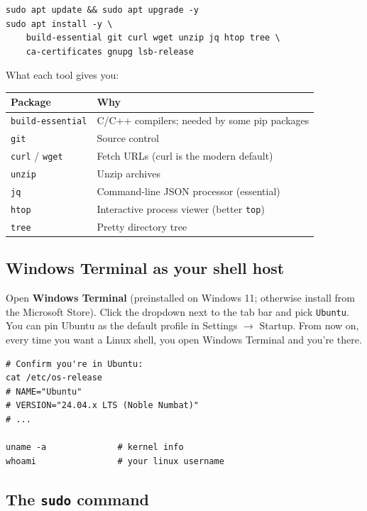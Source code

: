 \documentclass[11pt,a4paper]{article}
\begin{document}
\begin{lstlisting}[style=bashstyle]
sudo apt update && sudo apt upgrade -y
sudo apt install -y \
    build-essential git curl wget unzip jq htop tree \
    ca-certificates gnupg lsb-release
\end{lstlisting}

What each tool gives you:

\begin{center}
\begin{tabular}{ll}
\toprule
\textbf{Package} & \textbf{Why} \\
\midrule
\texttt{build-essential} & C/C++ compilers; needed by some pip packages \\
\texttt{git}            & Source control \\
\texttt{curl} / \texttt{wget} & Fetch URLs (curl is the modern default) \\
\texttt{unzip}          & Unzip archives \\
\texttt{jq}             & Command-line JSON processor (essential) \\
\texttt{htop}           & Interactive process viewer (better \texttt{top}) \\
\texttt{tree}           & Pretty directory tree \\
\bottomrule
\end{tabular}
\end{center}

\subsection*{Windows Terminal as your shell host}

Open \textbf{Windows Terminal} (preinstalled on Windows 11; otherwise
install from the Microsoft Store). Click the dropdown next to the
tab bar and pick \texttt{Ubuntu}. You can pin Ubuntu as the default
profile in Settings $\to$ Startup. From now on, every time you want a
Linux shell, you open Windows Terminal and you're there.

\begin{lstlisting}[style=bashstyle]
# Confirm you're in Ubuntu:
cat /etc/os-release
# NAME="Ubuntu"
# VERSION="24.04.x LTS (Noble Numbat)"
# ...

uname -a              # kernel info
whoami                # your linux username
\end{lstlisting}

\subsection*{The \texttt{sudo} command}
\end{document}
